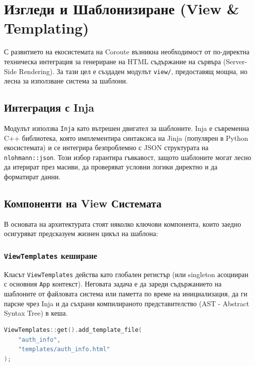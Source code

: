 \section{Изгледи и Шаблонизиране (View \& Templating)}
\label{sec:views-templating}

С развитието на екосистемата на Coroute възникна необходимост от по-директна техническа интеграция за генериране на HTML съдържание на сървъра (Server-Side Rendering). За тази цел е създаден модулът \texttt{view/}, предоставящ мощна, но лесна за използване система за шаблони.

\subsection{Интеграция с Inja}
Модулът използва \texttt{Inja} като вътрешен двигател за шаблоните. Inja е съвременна C++ библиотека, която имплементира синтаксиса на Jinja (популярен в Python екосистемата) и се интегрира безпроблемно с JSON структурата на \texttt{nlohmann::json}. Този избор гарантира гъвкавост, защото шаблоните могат лесно да итерират през масиви, да проверяват условни логики директно и да форматират данни.

\subsection{Компоненти на View Системата}

В основата на архитектурата стоят няколко ключови компонента, които заедно осигуряват предсказуем жизнен цикъл на шаблона:

\subsubsection{\texttt{ViewTemplates} кеширане}
Класът \texttt{ViewTemplates} действа като глобален регистър (или singleton асоцииран с основния \texttt{App} контекст). Неговата задача е да зареди съдържанието на шаблоните от файловата система или паметта по време на инициализация, да ги парсне чрез Inja и да съхрани компилираното представителство (AST - Abstract Syntax Tree) в кеша. 

\begin{lstlisting}[language=C++, basicstyle=\small\ttfamily, caption={Конфигурация на ViewTemplates}]
ViewTemplates::get().add_template_file(
    "auth_info", 
    "templates/auth_info.html"
);
\end{lstlisting}

